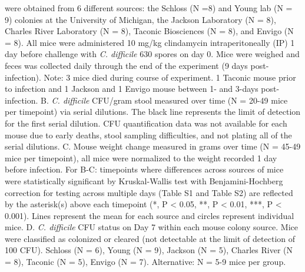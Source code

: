 \documentclass[11pt,]{article}
\begin{document}
were obtained from 6 different sources: the Schloss (N =8) and Young lab
(N = 9) colonies at the University of Michigan, the Jackson Laboratory
(N = 8), Charles River Laboratory (N = 8), Taconic Biosciences (N = 8),
and Envigo (N = 8). All mice were administered 10 mg/kg clindamycin
intraperitoneally (IP) 1 day before challenge with \emph{C. difficile}
630 spores on day 0. Mice were weighed and feces was collected daily
through the end of the experiment (9 days post-infection). Note: 3 mice
died during course of experiment. 1 Taconic mouse prior to infection and
1 Jackson and 1 Envigo mouse between 1- and 3-days post-infection. B.
\emph{C. difficile} CFU/gram stool measured over time (N = 20-49 mice
per timepoint) via serial dilutions. The black line represents the limit
of detection for the first serial dilution. CFU quantification data was
not available for each mouse due to early deaths, stool sampling
difficulties, and not plating all of the serial dilutions. C. Mouse
weight change measured in grams over time (N = 45-49 mice per
timepoint), all mice were normalized to the weight recorded 1 day before
infection. For B-C: timepoints where differences across sources of mice
were statistically significant by Kruskal-Wallis test with
Benjamini-Hochberg correction for testing across multiple days (Table S1
and Table S2) are reflected by the asterisk(s) above each timepoint (*,
P \textless{} 0.05, **, P \textless{} 0.01, ***, P \textless{} 0.001).
Lines represent the mean for each source and circles represent
individual mice. D. \emph{C. difficile} CFU status on Day 7 within each
mouse colony source. Mice were classified as colonized or cleared (not
detectable at the limit of detection of 100 CFU). Schloss (N = 6), Young
(N = 9), Jackson (N = 5), Charles River (N = 8), Taconic (N = 5), Envigo
(N = 7). Alternative: N = 5-9 mice per group.

\newpage
\end{document}
